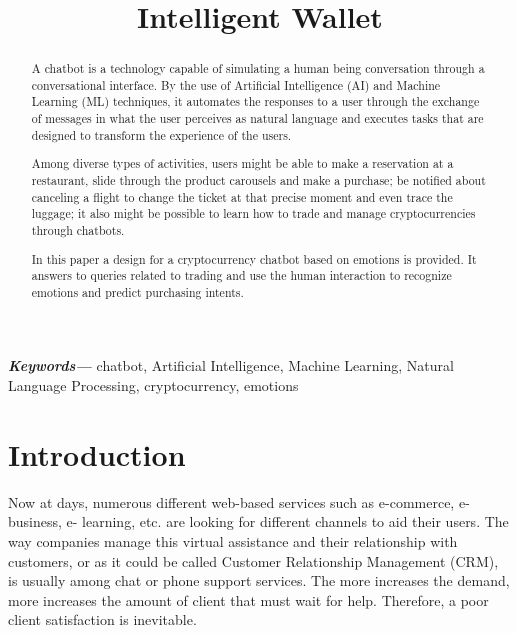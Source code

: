 \documentclass[	DIV=calc,%
							paper=letter,%
							fontsize=12pt%
                            ]{scrartcl}	 					%
\title{Intelligent Wallet}					%
\author{}											%
\date{}																				%
\newcommand{\initial}[1]{%
     \lettrine[lines=3,lhang=0.3,nindent=0em]{
     				\color{DarkGoldenrod}
     				{\textsf{#1}}}{}}
\providecommand{\keywords}[1]
{
  \small	
  \textbf{\textit{Keywords---}} #1
}
\begin{document}
\maketitle


\newpage
\begin{abstract}
	
{A chatbot is a technology capable of simulating a human being conversation through a conversational interface. By the use of Artificial Intelligence (AI) and Machine Learning (ML) techniques, it automates the responses to a user through the exchange of messages in what the user perceives as natural language and executes tasks that are designed to transform the experience of the users.

Among diverse types of activities, users might be able to make a reservation   at a restaurant, slide through the product carousels and make a purchase; be notified about canceling a flight to change the ticket at that precise moment and even trace the luggage; it also might be possible to learn how to trade and manage cryptocurrencies through chatbots.

In this paper a design for a cryptocurrency chatbot based on emotions is provided. It answers to queries related to trading and use the human interaction to recognize emotions and predict purchasing intents.}

\end{abstract}

\keywords{chatbot, Artificial Intelligence, Machine Learning, Natural Language Processing, cryptocurrency, emotions}

\newpage
\tableofcontents
\newpage
\listoffigures
\newpage

\thispagestyle{fancy} 			%

\section{\label{sec:level1}Introduction}
Now at days, numerous different web-based services such as e-commerce, e-business, e- learning, etc. are looking for different channels to aid their users. The way companies manage this virtual assistance and their relationship with customers, or as it could be called Customer Relationship Management (CRM), is usually among chat or phone support services. The more increases the demand, more increases the amount of client that must wait for help.  Therefore, a poor client satisfaction is inevitable\cite{ranoliya2017chatbot_08126057}.
\end{document}
